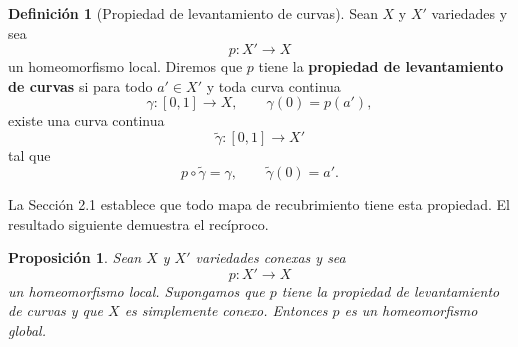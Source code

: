 \documentclass[11pt,a4paper]{article}
\theoremstyle{definition}
\newtheorem{definicion}{Definición}[section]
\theoremstyle{plain}
\newtheorem{proposicion}{Proposición}[section]
\theoremstyle{remark}
\newcommand{\I}{[0,1]}
\begin{document}
\begin{definicion}[Propiedad de levantamiento de curvas]
Sean $X$ y $X'$ variedades y sea
\[
p:X'\longrightarrow X
\]
un homeomorfismo local. Diremos que $p$ tiene la
\textbf{propiedad de levantamiento de curvas} si para todo
$a'\in X'$ y toda curva continua
\[
\gamma:\I\longrightarrow X,
\qquad
\gamma(0)=p(a'),
\]
existe una curva continua
\[
\widetilde\gamma:\I\longrightarrow X'
\]
tal que
\[
p\circ\widetilde\gamma=\gamma,
\qquad
\widetilde\gamma(0)=a'.
\]
\end{definicion}

La Sección 2.1 establece que todo mapa de recubrimiento tiene esta
propiedad. El resultado siguiente demuestra el recíproco.

\begin{proposicion}
Sean $X$ y $X'$ variedades conexas y sea
\[
p:X'\longrightarrow X
\]
un homeomorfismo local. Supongamos que $p$ tiene la propiedad de
levantamiento de curvas y que $X$ es simplemente conexo. Entonces $p$
es un homeomorfismo global.
\end{proposicion}
\end{document}
